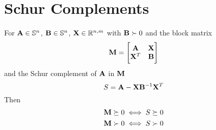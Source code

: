 \section{Schur Complements}

For $\mathbf{A}\in\mathbb{S}^{n}$, $\mathbf{B}\in\mathbb{S}^{n}$, $\mathbf{X}\in\mathbb{R}^{n,m}$ with $\mathbf{B}\succ0$ and the block matrix
\begin{equation}
\mathbf{M}=
\begin{bmatrix}
\mathbf{A} & \mathbf{X} \\
\mathbf{X}^T & \mathbf{B}
\end{bmatrix}
\end{equation}
and the Schur complement of $\mathbf{A}$ in $\mathbf{M}$
\begin{equation}
S=\mathbf{A}-\mathbf{X}\mathbf{B}^{-1}\mathbf{X}^T
\end{equation}
Then
\begin{align}
\mathbf{M}\succeq0&\iff S\succeq0 \\
\mathbf{M}\succ0 &\iff S\succ0 
\end{align}

